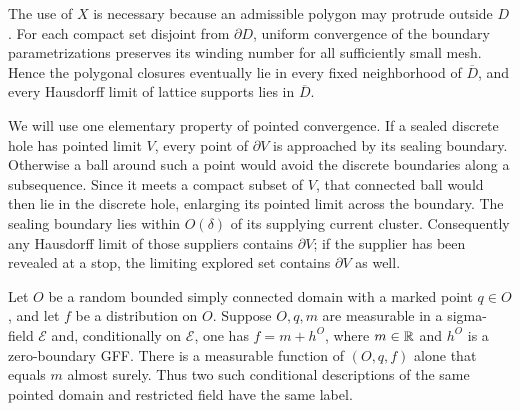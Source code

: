 The use of \(X\) is necessary because an admissible polygon may
protrude outside \(D\). For each compact set disjoint from \(\partial D\),
uniform convergence of the boundary parametrizations preserves its
winding number for all sufficiently small mesh. Hence the polygonal
closures eventually lie in every fixed neighborhood of \(\overline D\),
and every Hausdorff limit of lattice supports lies in \(\overline D\).

We will use one elementary property of pointed convergence. If a sealed
discrete hole has pointed limit \(V\), every point of \(\partial V\)
is approached by its sealing boundary. Otherwise a ball around such a
point would avoid the discrete boundaries along a subsequence. Since
it meets a compact subset of \(V\), that connected ball would then lie
in the discrete hole, enlarging its pointed limit across the boundary.
The sealing boundary lies within \(O(\delta)\) of its supplying current
cluster. Consequently any Hausdorff limit of those suppliers contains
\(\partial V\); if the supplier has been revealed at a stop, the limiting
explored set contains \(\partial V\) as well.

\begin{lemma}
\label{lem:recover-flat-label}
Let \(O\) be a random bounded simply connected domain with a marked
point \(q\in O\), and let \(f\) be a distribution on \(O\).
Suppose \(O,q,m\) are measurable in a sigma-field \(\mathcal E\) and,
conditionally on \(\mathcal E\), one has \(f=m+h^O\), where \(m\in\mathbb R\)
and \(h^O\) is a zero-boundary GFF. There is a measurable function of
\((O,q,f)\) alone that equals \(m\) almost surely. Thus two such conditional descriptions
of the same pointed domain and restricted field have the same label.
\end{lemma}

